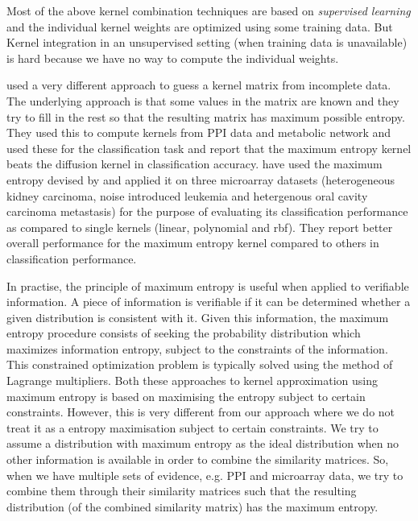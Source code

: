 Most of the above kernel combination techniques are based on \textit{supervised learning} and the individual kernel weights are optimized using some training data. But Kernel integration in an unsupervised setting (when training data is unavailable) is hard because we have no way to compute the individual weights. 

\citet{Tsuda2004Learning} used a very different approach to guess a kernel matrix from incomplete data. The underlying approach is that some values in the matrix are known and they try to fill in the rest so that the resulting matrix has maximum possible entropy. They used this to compute kernels from PPI data and metabolic network and used these for the classification task and report that the maximum entropy kernel beats the diffusion kernel in classification accuracy. \citet{fujibuchi2007classification} have used the maximum entropy devised by \citet{Tsuda2004Learning} and applied it on three microarray datasets (heterogeneous kidney carcinoma, noise introduced leukemia and hetergenous oral cavity carcinoma metastasis) for the purpose of evaluating its classification performance as compared to single kernels (linear, polynomial and rbf). They report better overall performance for the maximum entropy kernel compared to others in classification performance.  

In practise, the principle of maximum entropy is useful when applied to verifiable information. A piece of information is verifiable if it can be determined whether a given distribution is consistent with it. Given this information, the maximum entropy procedure consists of seeking the probability distribution which maximizes information entropy, subject to the constraints of the information. This constrained optimization problem is typically solved using the method of Lagrange multipliers. Both these approaches to kernel approximation \citep{Tsuda2004Learning, fujibuchi2007classification} using maximum entropy is based on maximising the entropy subject to certain constraints. However, this is very different from our approach where we do not treat it as a entropy maximisation subject to certain constraints. We try to assume a distribution with maximum entropy as the ideal distribution when no other information is available in order to combine the similarity matrices. So, when we have multiple sets of evidence, e.g. PPI and microarray data, we try to combine them through their similarity matrices such that the resulting distribution (of the combined similarity matrix) has the maximum entropy.

